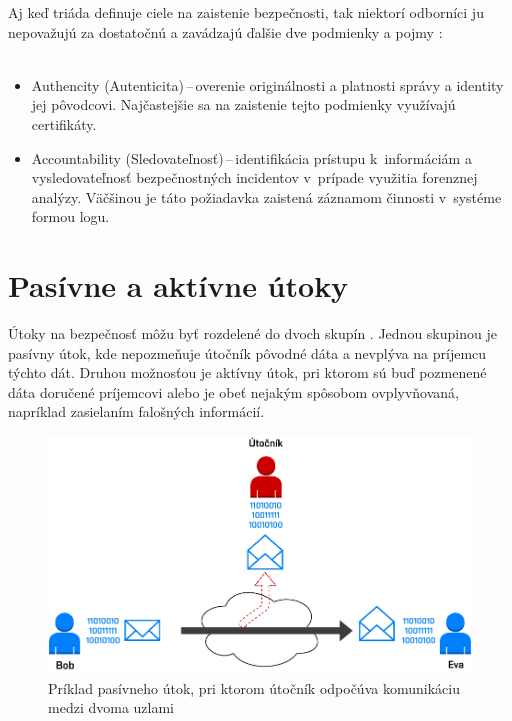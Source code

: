 	\noindent
	Aj keď triáda  definuje ciele na zaistenie bezpečnosti, tak niektorí odborníci ju nepovažujú za dostatočnú a zavádzajú ďalšie dve podmienky a pojmy  \cite{Stallings2011}:\\
	\\
	\begin{itemize}
		\item Authencity (Autenticita)\,--\,overenie originálnosti a platnosti správy a identity jej pôvodcovi. Najčastejšie sa na zaistenie tejto podmienky využívajú certifikáty.
		\item Accountability (Sledovateľnosť)\,--\,identifikácia prístupu k~informáciám a vysledovateľnosť bezpečnostných incidentov v~prípade využitia forenznej analýzy. Väčšinou je táto požiadavka zaistená záznamom činnosti v~systéme formou logu.
	\end{itemize}





\newpage
\section{Pasívne a aktívne útoky}
Útoky na bezpečnosť môžu byť rozdelené do dvoch skupín \cite{Vyncke2008}. Jednou skupinou je pasívny útok, kde nepozmeňuje útočník pôvodné dáta a nevplýva na príjemcu týchto dát. Druhou možnosťou je aktívny útok, pri ktorom sú buď pozmenené dáta doručené príjemcovi alebo je obeť nejakým spôsobom ovplyvňovaná, napríklad zasielaním falošných informácií.

\begin{figure}[H]
	\begin{center}
		\includegraphics[scale=0.55]{obrazky/passive-attack.pdf}
	\end{center}
	\caption[Pasívny útok]{Príklad pasívneho útok, pri ktorom útočník odpočúva komunikáciu medzi dvoma uzlami \cite{Stallings2011}}
	\label{passive-attack}
\end{figure}

